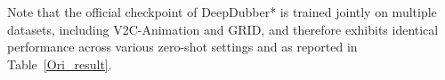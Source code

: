 \begin{table}[!t]
{  %
  Note that the official checkpoint of DeepDubber* is trained jointly on multiple datasets, including V2C-Animation and GRID, and therefore exhibits identical performance across various zero-shot settings and as reported in Table~\ref{Ori_result}.
  }
  \label{cross_1}%
\end{table}%